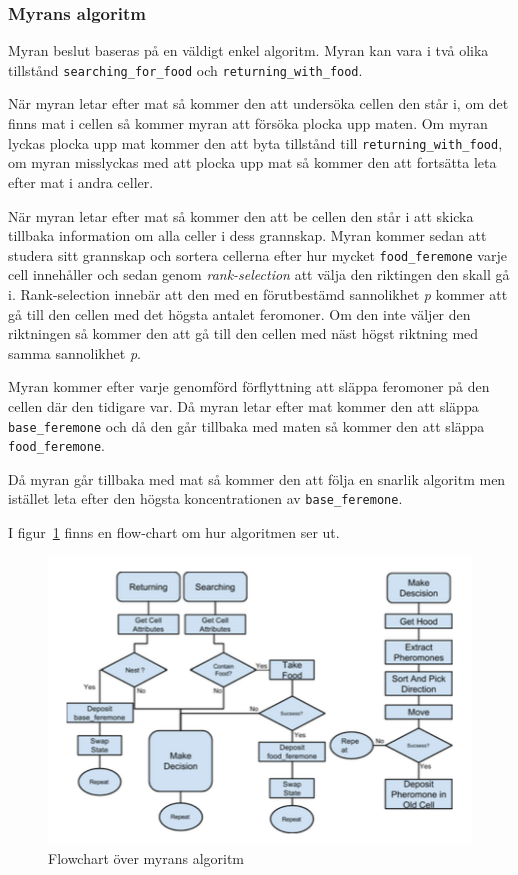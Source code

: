 \documentclass[12pt]{article}
\begin{document}
\subsubsection{Myrans algoritm}
Myran beslut baseras på en väldigt enkel algoritm.
Myran kan vara i två olika tillstånd \texttt{searching\_for\_food} och \texttt{returning\_with\_food}.

När myran letar efter mat så kommer den att undersöka cellen den står i,
om det finns mat i cellen så kommer myran att försöka plocka upp maten.
Om myran lyckas plocka upp mat kommer den att byta tillstånd till \texttt{returning\_with\_food},
om myran misslyckas med att plocka upp mat så kommer den att fortsätta leta efter mat i andra celler.

När myran letar efter mat så kommer den att be cellen den står i att skicka tillbaka information om alla celler i dess grannskap.
Myran kommer sedan att studera sitt grannskap och sortera cellerna efter hur mycket \texttt{food\_feremone} varje cell innehåller och sedan genom \textit{rank-selection} att välja den riktingen den skall gå i.
Rank-selection innebär att den med en förutbestämd sannolikhet \textit{p} kommer att gå till den cellen med det högsta antalet feromoner.
Om den inte väljer den riktningen så kommer den att gå till den cellen med näst högst riktning med samma sannolikhet \textit{p}.

Myran kommer efter varje genomförd förflyttning att släppa feromoner på den cellen där den tidigare var.
Då myran letar efter mat kommer den att släppa \texttt{base\_feremone} och då den går tillbaka med maten så kommer den att släppa \texttt{food\_feremone}.

Då myran går tillbaka med mat så kommer den att följa en snarlik algoritm men istället leta efter den högsta koncentrationen av \texttt{base\_feremone}.

I figur~\ref{fig:ant-algorithm} finns en flow-chart om hur algoritmen ser ut.


\begin{figure}[H]
    \centering
    \includegraphics[width=\textwidth]{BugsLife-Fig3.png}
    \caption{Flowchart över myrans algoritm}\label{fig:ant-algorithm}
\end{figure}
\newpage
\end{document}
